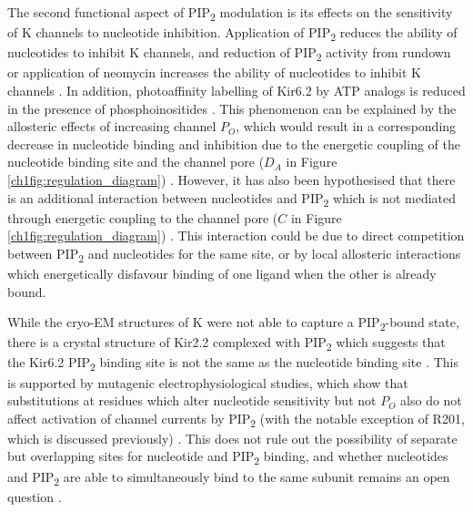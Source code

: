 The second functional aspect of PIP\textsubscript{2} modulation is its effects on the sensitivity of K\ATP{} channels to nucleotide inhibition.
Application of PIP\textsubscript{2} reduces the ability of nucleotides to inhibit K\ATP{} channels, and reduction of PIP\textsubscript{2} activity from rundown or application of neomycin increases the ability of nucleotides to inhibit K\ATP{} channels \cite{baukrowitz_pip2_1998, shyng_membrane_1998, fan_phosphoinositides_1999, enkvetchakul_kinetic_2000}.
In addition, photoaffinity labelling of Kir6.2 by ATP analogs is reduced in the presence of phosphoinositides \cite{wang_compromised_2002}.
This phenomenon can be explained by the allosteric effects of increasing channel $P_O$, which would result in a corresponding decrease in nucleotide binding and inhibition due to the energetic coupling of the nucleotide binding site and the channel pore ($D_A$ in Figure \ref{ch1fig:regulation_diagram}) \cite{proks_modeling_2009}.
However, it has also been hypothesised that there is an additional interaction between nucleotides and PIP\textsubscript{2} which is not mediated through energetic coupling to the channel pore ($C$ in Figure \ref{ch1fig:regulation_diagram}) \cite{fan_phosphoinositides_1999, macgregor_nucleotides_2002, proks_modeling_2009, haider_identification_2007}.
This interaction could be due to direct competition between PIP\textsubscript{2} and nucleotides for the same site, or by local allosteric interactions which energetically disfavour binding of one ligand when the other is already bound.

While the cryo-EM structures of K\ATP{} were not able to capture a PIP\textsubscript{2}-bound state, there is a crystal structure of Kir2.2 complexed with PIP\textsubscript{2} which suggests that the Kir6.2 PIP\textsubscript{2} binding site is not the same as the nucleotide binding site \cite{hansen_structural_2011}.
This is supported by mutagenic electrophysiological studies, which show that substitutions at residues which alter nucleotide sensitivity but not $P_O$ also do not affect activation of channel currents by PIP\textsubscript{2} (with the notable exception of R201, which is discussed previously) \cite{fan_anionic_1997, shyng_structural_2000, schulze_phosphatidylinositol_2003, haider_identification_2007}.
This does not rule out the possibility of separate but overlapping sites for nucleotide and PIP\textsubscript{2} binding, and whether nucleotides and PIP\textsubscript{2} are able to simultaneously bind to the same subunit remains an open question \cite{enkvetchakul_gating_2003-2, proks_modeling_2009}.


